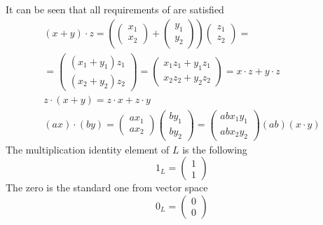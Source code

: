 \begin{example}
  It can be seen that all requirements of  are
  satisfied
  \begin{eqnarray}
    (x + y) \cdot z =
    \left(
    \left(
    \begin{array}{c}
      x_1 \\
      x_2
    \end{array}
    \right)
    +
    \left(
    \begin{array}{c}
      y_1 \\
      y_2
    \end{array}
    \right)
    \right)
    \left(
    \begin{array}{c}
      z_1 \\
      z_2
    \end{array}
    \right) =
    \nonumber \\
    =
    \left(
    \begin{array}{c}
      (x_1 + y_1)z_1 \\
      (x_2 + y_2)z_2
    \end{array}
    \right) =
    \left(
    \begin{array}{c}
      x_1 z_1 + y_1 z_1 \\
      x_2 z_2 + y_2 z_2
    \end{array}
    \right) =
    x \cdot z + y \cdot z
    \nonumber \\
    z \cdot (x + y) = z \cdot x + z \cdot y
    \nonumber \\
    (ax) \cdot (by) =
    \left(
    \begin{array}{c}
      a x_1 \\
      a x_2
    \end{array}
    \right)
    \left(
    \begin{array}{c}
      b y_1 \\
      b y_2
    \end{array}
    \right) =
    \left(
    \begin{array}{c}
      ab x_1 y_1 \\
      ab x_2 y_2
    \end{array}
    \right)
    (ab) (x \cdot y)
    \nonumber
  \end{eqnarray}
  The multiplication identity element of $L$ is the following
  \[
  1_L = 
  \left(
  \begin{array}{c}
    1 \\
    1
  \end{array}
  \right)
  \]
  The zero is the standard one from vector space
  \[
  0_L = 
  \left(
  \begin{array}{c}
    0 \\
    0
  \end{array}
  \right)
  \]


\end{example}
